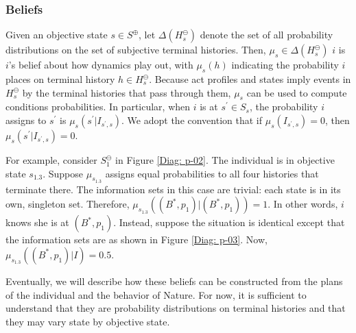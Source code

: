 \documentclass[
11pt,
titlepage,
reqno,
]{article}%
\theoremstyle{definition}
\begin{document}
\subsubsection{Beliefs} \label{sec: beliefs}
Given an objective state $s\in S^\oplus$, let $\Delta(H^\ominus_s)$ denote the set of all probability distributions on the set of subjective terminal histories. 
Then,  $\mu_s\in \Delta(H^\ominus_s)$ $i$ is $i$'s belief about how dynamics play out, with $\mu_s(h)$ indicating the probability $i$ places on terminal history $h\in H^\ominus_s$. 
Because act profiles and states imply events in $H^\ominus_s$ by the terminal histories that pass through them, $\mu_s$ can be used to compute conditions probabilities.
In particular, when $i$ is at $s^\prime\in S_s$, the probability $i$ assigns to $s^\prime$ is  $\mu_s(s^\prime|I_{s^\prime,s})$.
We adopt the convention that if  $\mu_s(I_{s^\prime,s})=0$, then  $\mu_s(s^\prime|I_{s^\prime,s})=0$.

For example, consider $S^\ominus_1$ in Figure \ref{Diag: p-02}. 
The individual is in objective state $s_{1.3}$.
Suppose $\mu_{s_{1.3}}$ assigns equal probabilities to all four histories that terminate there.
The information sets in this case are trivial: each state is in its own, singleton set.
Therefore,  $\mu_{s_{1.3}}((B^\ast,p_1)|(B^\ast,p_1))=1$.
In other words, $i$ knows she is at $(B^\ast,p_1)$.
Instead, suppose the situation is identical except that the information sets are as shown in Figure \ref{Diag: p-03}.
Now, $\mu_{s_{1.3}}((B^\ast,p_1)|I)=0.5$.

Eventually, we will describe how these beliefs can be constructed from the plans of the individual and the behavior of Nature. 
For now, it is sufficient to understand that they are probability distributions on terminal histories and that they may vary state by objective state.
\end{document}
